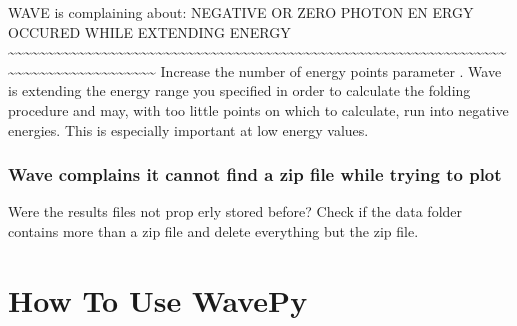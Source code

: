 \documentclass[letterpaper,10pt,english]{sphinxmanual}
\begin{document}
\sphinxAtStartPar
WAVE is complaining about: NEGATIVE OR ZERO PHOTON EN\sphinxhyphen{}
ERGY OCCURED WHILE EXTENDING ENERGY
\textasciitilde{}\textasciitilde{}\textasciitilde{}\textasciitilde{}\textasciitilde{}\textasciitilde{}\textasciitilde{}\textasciitilde{}\textasciitilde{}\textasciitilde{}\textasciitilde{}\textasciitilde{}\textasciitilde{}\textasciitilde{}\textasciitilde{}\textasciitilde{}\textasciitilde{}\textasciitilde{}\textasciitilde{}\textasciitilde{}\textasciitilde{}\textasciitilde{}\textasciitilde{}\textasciitilde{}\textasciitilde{}\textasciitilde{}\textasciitilde{}\textasciitilde{}\textasciitilde{}\textasciitilde{}\textasciitilde{}\textasciitilde{}\textasciitilde{}\textasciitilde{}\textasciitilde{}\textasciitilde{}\textasciitilde{}\textasciitilde{}\textasciitilde{}\textasciitilde{}\textasciitilde{}\textasciitilde{}\textasciitilde{}\textasciitilde{}\textasciitilde{}\textasciitilde{}\textasciitilde{}\textasciitilde{}\textasciitilde{}\textasciitilde{}\textasciitilde{}\textasciitilde{}\textasciitilde{}\textasciitilde{}\textasciitilde{}\textasciitilde{}\textasciitilde{}\textasciitilde{}\textasciitilde{}\textasciitilde{}\textasciitilde{}\textasciitilde{}\textasciitilde{}\textasciitilde{}\textasciitilde{}\textasciitilde{}\textasciitilde{}\textasciitilde{}\textasciitilde{}\textasciitilde{}\textasciitilde{}\textasciitilde{}\textasciitilde{}\textasciitilde{}\textasciitilde{}\textasciitilde{}\textasciitilde{}\textasciitilde{}\textasciitilde{}\textasciitilde{}\textasciitilde{}\textasciitilde{}\textasciitilde{}
Increase the number of energy points \sphinxhyphen{} parameter .
Wave is extending the energy range you specified in order to calculate
the folding procedure and may, with too little points on which to
calculate, run into negative energies. This is especially important at
low energy values.


\subsection{Wave complains it cannot find a zip file while trying to plot}
\label{\detokenize{installation:wave-complains-it-cannot-find-a-zip-file-while-trying-to-plot}}
\sphinxAtStartPar
Were the results files not prop erly stored before?
Check if the data folder contains more than a zip file and
delete everything but the zip file.

\sphinxstepscope


\chapter{How To Use WavePy}
\label{\detokenize{tutorial:how-to-use-wavepy}}\label{\detokenize{tutorial::doc}}
\end{document}
